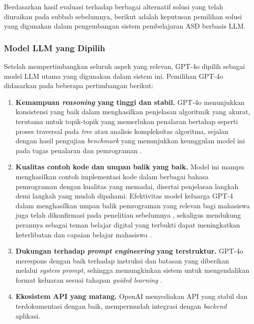Berdasarkan hasil evaluasi terhadap berbagai alternatif solusi yang telah diuraikan pada subbab sebelumnya, berikut adalah keputusan pemilihan solusi yang digunakan dalam pengembangan sistem pembelajaran ASD berbasis LLM.

\subsubsection{Model LLM yang Dipilih}

Setelah mempertimbangkan seluruh aspek yang relevan, GPT-4o dipilih sebagai model LLM utama yang digunakan dalam sistem ini. Pemilihan GPT-4o didasarkan pada beberapa pertimbangan berikut:

\begin{enumerate}
    \item \textbf{Kemampuan \textit{reasoning} yang tinggi dan stabil.} GPT-4o menunjukkan konsistensi yang baik dalam menghasilkan penjelasan algoritmik yang akurat, terutama untuk topik-topik yang memerlukan penalaran bertahap seperti proses traversal pada \textit{tree} atau analisis kompleksitas algoritma, sejalan dengan hasil pengujian \textit{benchmark} yang menunjukkan keunggulan model ini pada tugas penalaran dan pemrograman \autocite{OpenAI2023GPT4TechnicalReport}.

    \item \textbf{Kualitas contoh kode dan umpan balik yang baik.} Model ini mampu menghasilkan contoh implementasi kode dalam berbagai bahasa pemrograman dengan kualitas yang memadai, disertai penjelasan langkah demi langkah yang mudah dipahami. Efektivitas model keluarga GPT-4 dalam menghasilkan umpan balik pemrograman yang relevan bagi mahasiswa juga telah dikonfirmasi pada penelitian sebelumnya \autocite{Jacobs2024LLMFeedbackProgramming}, sekaligus mendukung perannya sebagai teman belajar digital yang terbukti dapat meningkatkan keterlibatan dan capaian belajar mahasiswa \autocite{Vanzo2024GPT4HomeworkTutor}.

    \item \textbf{Dukungan terhadap \textit{prompt engineering} yang terstruktur.} GPT-4o merespons dengan baik terhadap instruksi dan batasan yang diberikan melalui \textit{system prompt}, sehingga memungkinkan sistem untuk mengendalikan format keluaran sesuai tahapan \textit{guided learning} \autocite{White2023PromptPatternCatalog}.

    \item \textbf{Ekosistem API yang matang.} OpenAI menyediakan API yang stabil dan terdokumentasi dengan baik, mempermudah integrasi dengan \textit{backend} aplikasi.
\end{enumerate}

